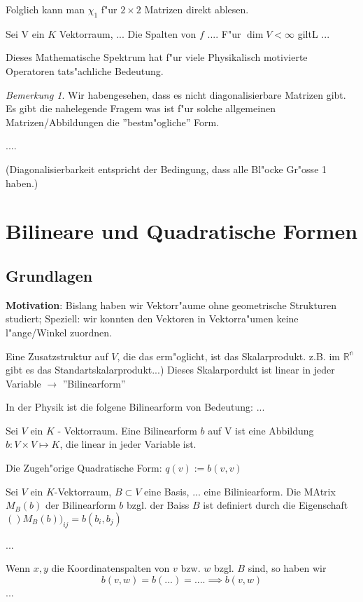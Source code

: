 \documentclass[oneside,fontsize=11pt,paper=a4,BCOR=0mm,DIV=12,automark,headsepline]{scrbook}
\theoremstyle{remark}
\theoremstyle{definition}
\theoremstyle{definition}
\theoremstyle{remark}
\newtheorem*{bem}{Bemerkung}
\begin{document}
Folglich kann man $\chi_1$ f"ur $2\times 2$ Matrizen direkt ablesen.

\begin{definition}
  Sei V ein $K$ Vektorraum, ... Die Spalten von $f$ .... F"ur $\dim V < \infty$
  giltL ... 
\end{definition}
Dieses Mathematische Spektrum hat f"ur viele Physikalisch motivierte Operatoren
tats"achliche Bedeutung.

\begin{bem}
  Wir habengesehen, dass es nicht diagonalisierbare Matrizen gibt. Es gibt die
  nahelegende Fragem was ist f"ur solche allgemeinen Matrizen/Abbildungen die
  ''bestm"ogliche'' Form.
\end{bem}
\begin{relation}
  ....

  (Diagonalisierbarkeit entspricht der Bedingung, dass  alle Bl"ocke Gr"osse 1 haben.)
\end{relation}

\part{Bilineare und Quadratische Formen}
\chapter{Grundlagen}
\label{sec:bili}
\textbf{Motivation}: Bislang haben wir Vektorr"aume ohne geometrische Strukturen
studiert; Speziell: wir konnten den Vektoren in Vektorra"umen keine
l"ange/Winkel zuordnen.

Eine Zusatzstruktur auf $V$, die das erm"oglicht, ist das Skalarprodukt. z.B.
im $\mathbb{R^n}$ gibt es das Standartskalarprodukt...) Dieses Skalarpordukt ist
linear in jeder Variable $\rightarrow$ ''Bilinearform''

In der Physik ist die folgene Bilinearform von Bedeutung: ...

\begin{definition}
  Sei $V$ ein $K$ - Vektorraum. Eine Bilinearform $b$ auf V ist eine Abbildung
  $b: V\times V \mapsto K$, die linear in jeder Variable ist.

  Die Zugeh"orige Quadratische Form: $q(v):=b(v,v)$
\end{definition}



\begin{definition}
  Sei $V$ ein $K$-Vektorraum, $B\subset V$ eine Basis, ... eine Biliniearform.
  Die MAtrix $M_B(b)$ der Bilinearform $b$ bzgl. der Baiss $B$ ist definiert
  durch die Eigenschaft $()M_B(b))_{ij}=b(b_i, b_j)$
\end{definition}
\begin{exa}
  ...
\end{exa}
Wenn $x,y$ die Koordinatenspalten von $v$ bzw. $w$ bzgl. $B$ sind, so haben wir
\[b(v,w)=b(...)=.... \implies b(v,w)\] ...
\end{document}
